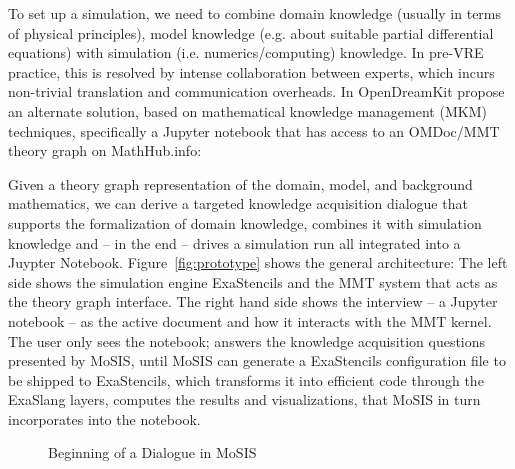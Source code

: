  To set up a simulation, we need to combine domain knowledge (usually in terms of physical principles), model knowledge (e.g. about suitable partial differential equations) with simulation (i.e. numerics/computing) knowledge.
In pre-VRE practice, this is resolved by intense collaboration between experts, which incurs non-trivial translation and communication overheads.
In OpenDreamKit propose an alternate solution, based on mathematical knowledge management (MKM) techniques, specifically a Jupyter notebook that has access to an OMDoc/MMT theory graph on MathHub.info: 

Given a theory graph representation of the domain, model, and background mathematics, we
can derive a targeted knowledge acquisition dialogue that supports the formalization of
domain knowledge, combines it with simulation knowledge and -- in the end -- drives a
simulation run all integrated into a Juypter Notebook.
Figure~\ref{fig:prototype} shows the general architecture:
The left side shows the simulation engine \textsf{ExaStencils} and the MMT system that acts as the theory graph interface.
The right hand side shows the interview – a Jupyter notebook – as the active document and how it interacts with the MMT kernel.
The user only sees the notebook; answers the knowledge acquisition questions presented by MoSIS, until MoSIS can generate a ExaStencils configuration file to be shipped to ExaStencils, which transforms it into efficient code through the ExaSlang layers, computes the results and visualizations, that MoSIS in turn incorporates into the notebook. 

\begin{figure}[ht]
  \caption{Beginning of a Dialogue in MoSIS}\label{fig:int_begin}
\end{figure}

